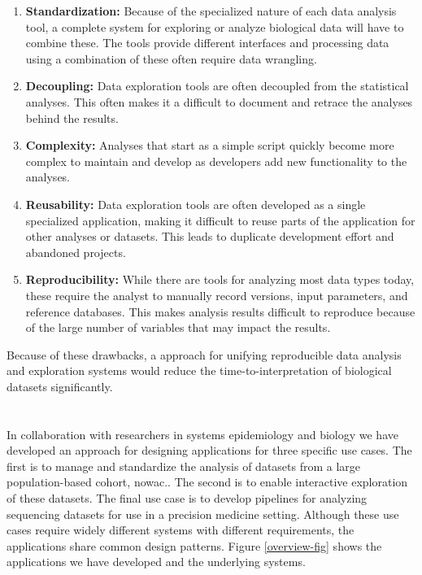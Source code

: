 \begin{enumerate}
    \item \textbf{Standardization:} Because of the specialized nature of each
        data analysis tool, a complete system for exploring or analyze
        biological data will have to combine these. The tools provide different
        interfaces and processing data using a combination of these often
        require data wrangling. 
    \item \textbf{Decoupling:} Data exploration tools are often decoupled from
        the statistical analyses. This often makes it a difficult to document
        and retrace the analyses behind the results. 
    \item \textbf{Complexity:} 
        Analyses that start as a simple script quickly become more complex to
        maintain and develop as developers add new functionality to the
        analyses. 
    \item \textbf{Reusability:} Data exploration tools are often
        developed as a single specialized application, making it difficult to
        reuse parts of the application for other analyses or datasets. This
        leads to duplicate development effort and abandoned projects. 
    \item \textbf{Reproducibility:} While there are tools for analyzing most
        data types today, these require the analyst to manually record versions,
        input parameters, and reference databases. This makes analysis results
        difficult to reproduce because of the large number of variables that may
        impact the results. 
\end{enumerate} 

Because of these drawbacks, a approach for unifying reproducible data analysis
and exploration systems would reduce the time-to-interpretation of biological
datasets significantly. 

\section{} 
In collaboration with researchers in systems epidemiology and biology we have
developed an approach for designing applications for three specific use cases.
The first is to manage and standardize the analysis of datasets from a large
population-based cohort, \gls{nowac}.\cite{nowac}. The second is to enable
interactive exploration of these datasets.  The final use case is to develop
pipelines for analyzing sequencing datasets for use in a precision medicine
setting.  Although these use cases require widely different systems with
different requirements, the applications share common design patterns. Figure
\ref{overview-fig} shows the applications we have developed and the underlying
systems. 

